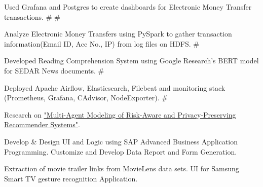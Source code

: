 \documentclass[]{Vishnu-Resume}
\begin{document}
\begin{minipage}[t]{0.66\textwidth}
\begin{tightemize}
\item Used Grafana and Postgres to create dashboards for Electronic Money Transfer transactions. \# \#
\item Analyze Electronic Money Transfers using PySpark to gather transaction information(Email ID, Acc No., IP) from log files on HDFS. \#
\item Developed Reading Comprehension System using Google Research's BERT model for SEDAR News documents. \#
\end{tightemize}
\sectionsep

\begin{tightemize}
\item Deployed Apache Airflow, Elasticsearch, Filebeat and monitoring stack (Prometheus, Grafana, CAdvisor, NodeExporter). \#
\end{tightemize}
\sectionsep

\begin{tightemize}
\item Research on {\href{https://uwspace.uwaterloo.ca/handle/10012/11732}{"Multi-Agent Modeling of Risk-Aware and Privacy-Preserving Recommender Systems"}}.
\end{tightemize}
\sectionsep

\begin{tightemize}
\item Develop \& Design UI and Logic using SAP Advanced Business Application
Programming. Customize and Develop Data Report and Form Generation.
\end{tightemize}
\sectionsep

\begin{tightemize}
\item Extraction of movie trailer links from MovieLens data sets. UI for Samsung Smart TV gesture recognition Application.
\end{tightemize}
\sectionsep


\end{minipage}
\end{document}
